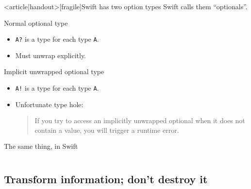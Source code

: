 \begin{frame}<article|handout>[fragile]{Swift has two option types}
  Swift calls them ``optionals''.

  \begin{block}{Normal optional type}
    \begin{itemize}
    \item \texttt{A?} is a type for each type \texttt{A}.
    \item Must unwrap explicitly.
    \end{itemize}
  \end{block}

  \begin{block}{Implicit unwrapped optional type}
    \begin{itemize}
    \item \texttt{A!} is a type for each type \texttt{A}.
    \item Unfortunate type hole:
      \begin{quote}
        If you try to access an implicitly unwrapped optional when it
        does not contain a value, you will trigger a runtime error.
      \end{quote}
    \end{itemize}
  \end{block}
\end{frame}

\begin{frame}[fragile]{The same thing, in Swift}
  \inputminted{swift}{FizzBuzz8.swift}
\end{frame}

\subsection{Transform information; don't destroy it}

